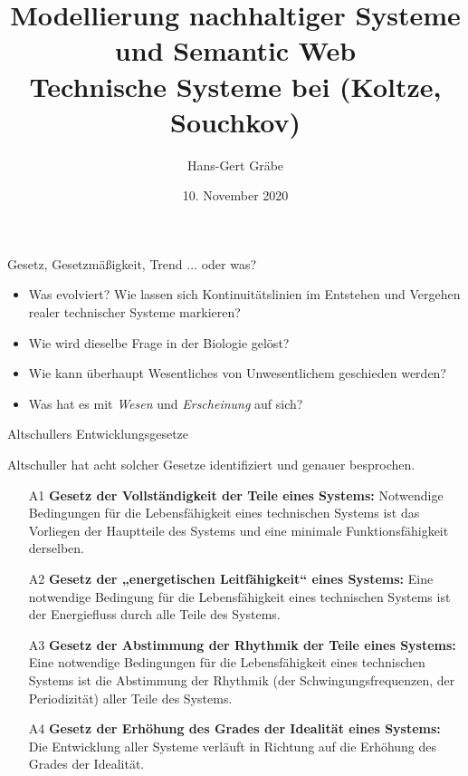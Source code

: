 \documentclass{beamer}
\title{Modellierung nachhaltiger Systeme\\ und Semantic Web\\[6pt] Technische
  Systeme bei (Koltze, Souchkov)}
\author{Hans-Gert Gr\"abe}
\date{10. November 2020}
\begin{document}
\begin{frame}
  \maketitle
\end{frame}

\begin{frame}{Gesetz, Gesetzmäßigkeit, Trend ... oder was?}
  \begin{itemize}[label={$\bullet$},itemsep=1em]
  \item Was evolviert? Wie lassen sich Kontinuitätslinien im Entstehen und
    Vergehen realer technischer Systeme markieren?
  \item Wie wird dieselbe Frage in der Biologie gelöst?
  \item Wie kann überhaupt Wesentliches von Unwesentlichem geschieden werden?
  \item Was hat es mit \emph{Wesen} und \emph{Erscheinung} auf sich?
  \end{itemize}
\end{frame}

\begin{frame}{Altschullers Entwicklungsgesetze}

Altschuller hat acht solcher Gesetze identifiziert und genauer besprochen.
\small
\begin{enumerate}
\item[A1] \textbf{Gesetz der Vollständigkeit der Teile eines Systems:}
  Notwendige Bedingungen für die Lebensfähigkeit eines technischen Systems ist
  das Vorliegen der Hauptteile des Systems und eine minimale
  Funktionsfähigkeit derselben.
\item[A2] \textbf{Gesetz der „energetischen Leitfähigkeit“ eines Systems:}
  Eine notwendige Bedingung für die Lebensfähigkeit eines technischen Systems
  ist der Energiefluss durch alle Teile des Systems.
\item[A3] \textbf{Gesetz der Abstimmung der Rhythmik der Teile eines Systems:}
  Eine notwendige Bedingungen für die Lebensfähigkeit eines technischen
  Systems ist die Abstimmung der Rhythmik (der Schwingungsfrequenzen, der
  Periodizität) aller Teile des Systems.
\item[A4] \textbf{Gesetz der Erhöhung des Grades der Idealität eines Systems:}
  Die Entwicklung aller Systeme verläuft in Richtung auf die Erhöhung des
  Grades der Idealität.
\end{enumerate}
\end{frame}
\end{document}

